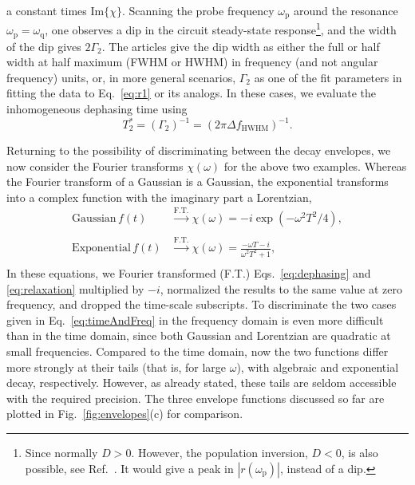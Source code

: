\documentclass[aps, prx, showpacs, twocolumn, superscriptaddress, notitlepage, longbibliography, floatfix, nofootinbib]{revtex4-2}
\begin{document}
a constant times $\mathrm{Im}\{\chi\}$. 
Scanning the probe frequency $\omega_\mathrm{p}$ around the resonance $\omega_\mathrm{p}=\omega_\mathrm{q}$, one observes a dip in the circuit steady-state response\footnote{Since normally $D>0$. However, the population inversion, $D<0$, is also possible, see Ref.~\cite{hauss_single-qubit_2008}. It would give a peak in $|r(\omega_\mathrm{p})|$, instead of a dip.}, and the width of the dip gives $2\Gamma_2$. The articles give the dip width as either the full or half width at half maximum (FWHM or HWHM) in frequency (and not angular frequency) units, or, in more general scenarios, $\Gamma_2$ as one of the fit parameters in fitting the data to Eq.~\eqref{eq:r1} or its analogs. In these cases, we evaluate the inhomogeneous dephasing time using
\begin{equation}
T_2^* = (\Gamma_2)^{-1}= \left( 2 \pi \Delta\! f_\mathrm{HWHM} \right)^{-1}.
\label{eq:HWHM}
\end{equation}



Returning to the possibility of discriminating between the decay envelopes, we now consider the Fourier transforms $\chi(\omega)$ for the above two examples. Whereas the Fourier transform of a Gaussian is a Gaussian, the exponential transforms into a complex function with the imaginary part a Lorentzian,
\begin{subequations}
\begin{align}
\textrm{Gaussian}\,f(t) &\overset{\mathrm{F.T.}}{\to}  \chi(\omega) = -i \exp( - \omega^2 T^2/4),\\
\nonumber\\
\textrm{Exponential}\,f(t) &\overset{\mathrm{F.T.}}{\to}   \chi(\omega) = \frac{- \omega T-i}{\omega^2 T^2 + 1},\\
\nonumber
\end{align}
\label{eq:timeAndFreq}
\end{subequations}
In  these equations, we Fourier transformed (F.T.) Eqs.~\eqref{eq:dephasing} and \eqref{eq:relaxation} multiplied by $-i$, normalized the results to the same value at zero frequency, and dropped the time-scale subscripts. To discriminate the two cases given in Eq.~\eqref{eq:timeAndFreq} in the frequency domain is even more difficult than in the time domain, since both Gaussian and Lorentzian are quadratic at small frequencies. Compared to the time domain, now the two functions differ more strongly at their tails (that is, for large $\omega$), with algebraic and exponential decay, respectively. However, as already stated, these tails are seldom accessible with the required precision. The three envelope functions discussed so far are plotted in Fig.~\ref{fig:envelopes}(c) for comparison.
\end{document}
